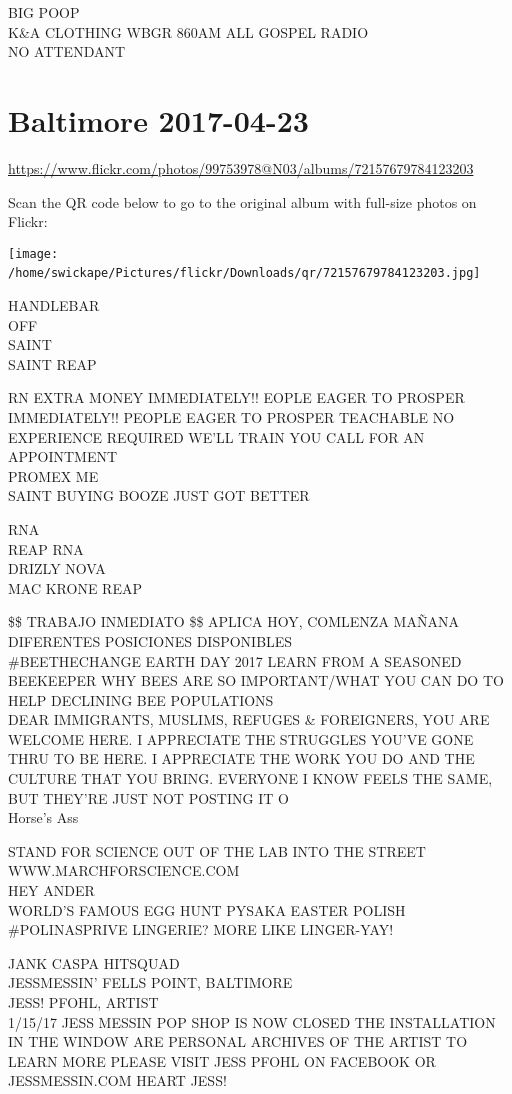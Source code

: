 \documentclass[10pt,letterpaper]{article}
\begin{document}
BIG POOP\\
K\&A CLOTHING WBGR 860AM ALL GOSPEL RADIO\\
NO ATTENDANT
\

\section*{Baltimore 2017-04-23}

\url{https://www.flickr.com/photos/99753978@N03/albums/72157679784123203}

Scan the QR code below to go to the original album with full-size photos on Flickr:

\texttt{[image: /home/swickape/Pictures/flickr/Downloads/qr/72157679784123203.jpg]}
\

HANDLEBAR\\
OFF\\
SAINT\\
SAINT REAP

RN EXTRA MONEY IMMEDIATELY!! EOPLE EAGER TO PROSPER\\
IMMEDIATELY!!  PEOPLE EAGER TO PROSPER TEACHABLE NO EXPERIENCE REQUIRED WE'LL TRAIN YOU CALL FOR AN APPOINTMENT\\
PROMEX ME\\
SAINT BUYING BOOZE JUST GOT BETTER

RNA\\
REAP RNA\\
DRIZLY NOVA\\
MAC KRONE REAP

\$\$ TRABAJO INMEDIATO \$\$ APLICA HOY, COMLENZA MAÑANA DIFERENTES POSICIONES DISPONIBLES\\
\#BEETHECHANGE EARTH DAY 2017 LEARN FROM A SEASONED BEEKEEPER WHY BEES ARE SO IMPORTANT/WHAT YOU CAN DO TO HELP DECLINING BEE POPULATIONS\\
DEAR IMMIGRANTS, MUSLIMS, REFUGES \& FOREIGNERS, YOU ARE WELCOME HERE.  I APPRECIATE THE STRUGGLES YOU'VE GONE THRU TO BE HERE.  I APPRECIATE THE WORK YOU DO AND THE CULTURE THAT YOU BRING.  EVERYONE I KNOW FEELS THE SAME, BUT THEY'RE JUST NOT POSTING IT O\\
Horse's Ass

STAND FOR SCIENCE OUT OF THE LAB INTO THE STREET WWW.MARCHFORSCIENCE.COM\\
HEY ANDER\\
WORLD'S FAMOUS EGG HUNT PYSAKA EASTER POLISH\\
\#POLINASPRIVE LINGERIE? MORE LIKE LINGER{-}YAY!

JANK CASPA HITSQUAD\\
JESSMESSIN' FELLS POINT, BALTIMORE\\
JESS! PFOHL, ARTIST\\
1/15/17 JESS MESSIN POP SHOP IS NOW CLOSED THE INSTALLATION IN THE WINDOW ARE PERSONAL ARCHIVES OF THE ARTIST TO LEARN MORE PLEASE VISIT JESS PFOHL ON FACEBOOK OR JESSMESSIN.COM HEART JESS!
\end{document}

